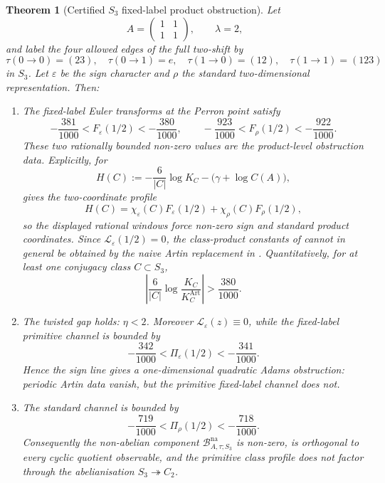 \documentclass[11pt,a4paper]{amsart}
\theoremstyle{plain}
\newtheorem{theorem}{Theorem}[section]
\theoremstyle{definition}
\theoremstyle{remark}
\begin{document}
\begin{theorem}[Certified \(S_3\) fixed-label product obstruction]
  \label{thm:s3-certified-nonabelian-defect}
  Let
  \[
    A=
    \begin{pmatrix}1&1\\1&1\end{pmatrix},
    \qquad \lambda=2,
  \]
  and label the four allowed edges of the full two-shift by
  \[
    \tau(0\to0)=(23),\quad \tau(0\to1)=e,
    \quad \tau(1\to0)=(12),\quad \tau(1\to1)=(123)
  \]
  in \(S_3\).  Let \(\varepsilon\) be the sign character and \(\rho\) the
  standard two-dimensional representation.  Then:
  \begin{enumerate}[label=\textup{(\roman*)}]
    \item The fixed-label Euler transforms at the Perron point satisfy
      \[
        -\frac{381}{1000}<F_\varepsilon(1/2)<-\frac{380}{1000},
        \qquad
        -\frac{923}{1000}<F_\rho(1/2)<-\frac{922}{1000}.
      \]
      These two rationally bounded non-zero values are the product-level
      obstruction data.  Explicitly, for
      \[
        H(C):=-\frac{6}{|C|}\log K_C-\bigl(\gamma+\log C(A)\bigr),
      \]
       gives the two-coordinate
      profile
      \[
        H(C)=\chi_\varepsilon(C)F_\varepsilon(1/2)
          +\chi_\rho(C)F_\rho(1/2),
      \]
      so the displayed rational windows force non-zero sign and standard
      product coordinates.  Since \(\mathcal L_\varepsilon(1/2)=0\), the
      class-product constants of
       cannot in general be obtained
      by the naive Artin replacement in
      .  Quantitatively, for at
      least one conjugacy class \(C\subset S_3\),
      \[
        \left|
          \frac{6}{|C|}
          \log\frac{K_C}{K_C^{\mathrm{Art}}}
        \right|
        >\frac{380}{1000}.
      \]
    \item The twisted gap holds: \(\eta<2\).  Moreover
      \(\mathcal L_\varepsilon(z)\equiv0\), while the fixed-label
      primitive channel is bounded by
      \[
        -\frac{342}{1000}
        <\Pi_\varepsilon(1/2)<-\frac{341}{1000}.
      \]
      Hence the sign line gives a one-dimensional quadratic Adams
      obstruction: periodic Artin data vanish, but the primitive
      fixed-label channel does not.
    \item The standard channel is bounded by
      \[
        -\frac{719}{1000}
        <\Pi_\rho(1/2)<-\frac{718}{1000}.
      \]
      Consequently the non-abelian component
      \(\mathcal B_{A,\tau;S_3}^{\mathrm{na}}\) is non-zero, is
      orthogonal to every cyclic quotient observable, and the primitive
      class profile does not factor through the abelianisation
      \(S_3\twoheadrightarrow C_2\).
  \end{enumerate}
\end{theorem}
\end{document}
